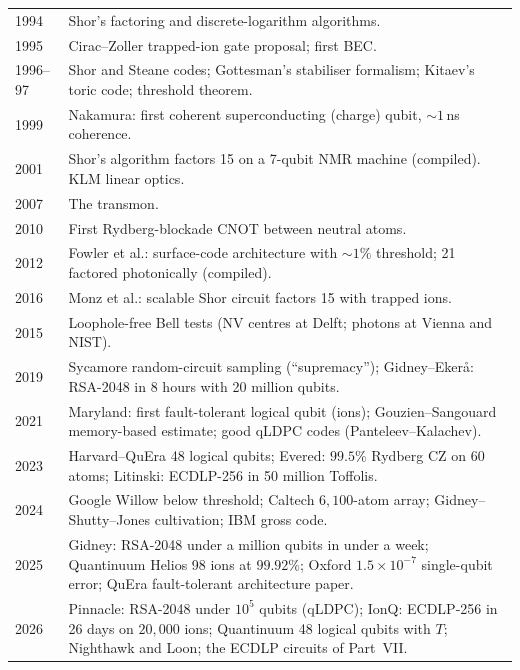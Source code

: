 \begin{center}\small
\renewcommand{\arraystretch}{1.1}
\begin{tabular}{@{}lp{12.4cm}@{}}
\toprule
1994 & Shor's factoring and discrete-logarithm algorithms. \\
1995 & Cirac--Zoller trapped-ion gate proposal; first BEC. \\
1996--97 & Shor and Steane codes; Gottesman's stabiliser formalism; Kitaev's toric code; threshold theorem. \\
1999 & Nakamura: first coherent superconducting (charge) qubit, $\sim1$\,ns coherence. \\
2001 & Shor's algorithm factors 15 on a 7-qubit NMR machine (compiled). KLM linear optics. \\
2007 & The transmon. \\
2010 & First Rydberg-blockade CNOT between neutral atoms. \\
2012 & Fowler et al.: surface-code architecture with $\sim1\%$ threshold; 21 factored photonically (compiled). \\
2016 & Monz et al.: scalable Shor circuit factors 15 with trapped ions. \\
2015 & Loophole-free Bell tests (NV centres at Delft; photons at Vienna and NIST). \\
2019 & Sycamore random-circuit sampling (``supremacy''); Gidney--Eker\aa: RSA-2048 in 8 hours with 20 million qubits. \\
2021 & Maryland: first fault-tolerant logical qubit (ions); Gouzien--Sangouard memory-based estimate; good qLDPC codes (Panteleev--Kalachev). \\
2023 & Harvard--QuEra 48 logical qubits; Evered: $99.5\%$ Rydberg CZ on 60 atoms; Litinski: ECDLP-256 in 50 million Toffolis. \\
2024 & Google Willow below threshold; Caltech $6,100$-atom array; Gidney--Shutty--Jones cultivation; IBM gross code. \\
2025 & Gidney: RSA-2048 under a million qubits in under a week; Quantinuum Helios 98 ions at $99.92\%$; Oxford $1.5\times10^{-7}$ single-qubit error; QuEra fault-tolerant architecture paper. \\
2026 & Pinnacle: RSA-2048 under $10^5$ qubits (qLDPC); IonQ: ECDLP-256 in 26 days on $20,000$ ions; Quantinuum 48 logical qubits with $T$; Nighthawk and Loon; the ECDLP circuits of Part~VII. \\
\bottomrule
\end{tabular}
\end{center}

